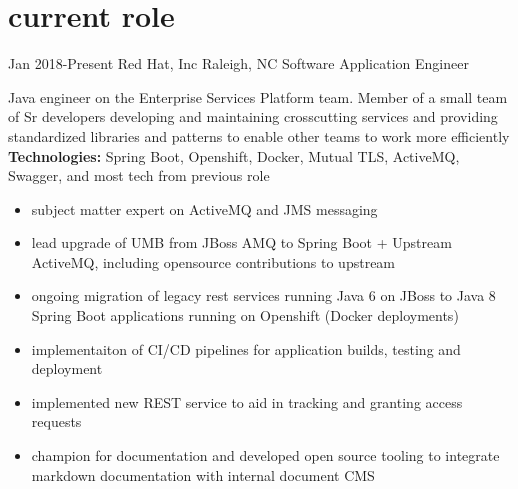 
\section{current role}

\begin{entrylist}


\workentry
{Jan 2018-Present}
{Red Hat, Inc}
{Raleigh, NC}
{Software Application Engineer}
{Java engineer on the Enterprise Services Platform team. Member of a small team of Sr developers developing and maintaining crosscutting services and providing standardized libraries and patterns to enable other teams to work more efficiently \\
\textbf{Technologies:} Spring Boot, Openshift, Docker, Mutual TLS, ActiveMQ, Swagger, and most tech from previous role
\begin{itemize}
\item subject matter expert on ActiveMQ and JMS messaging
\item lead upgrade of UMB from JBoss AMQ to Spring Boot + Upstream ActiveMQ, including opensource contributions to upstream
\item ongoing migration of legacy rest services running Java 6 on JBoss to Java 8 Spring Boot applications running on Openshift (Docker deployments)
\item implementaiton of CI/CD pipelines for application builds, testing and deployment
\item implemented new REST service to aid in tracking and granting access requests
\item champion for documentation and developed open source tooling to integrate markdown documentation with internal document CMS
\end{itemize}}


\end{entrylist}
